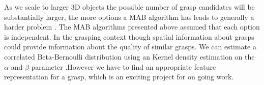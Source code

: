 \documentclass[a4paper, 10pt, conference]{ieeeconf}      %
\begin{document}
As we scale to larger 3D objects the possible number of grasp candidates will be substantially larger, the more options a MAB algorithm has leads to generally a harder problem \cite{bubeck2009pure}. The MAB algorithms presented above assumed that each option is independent. In the grasping context though spatial information about grasps could provide information about the quality of similar grasps. We can estimate a correlated Beta-Bernoulli distribution using an Kernel density estimation on the $\alpha$ and $\beta$ parameter \cite{goetschalckx2011continuous}.However we have to find an appropriate feature representation for a grasp, which is an exciting project for on going work. 


\end{document}
